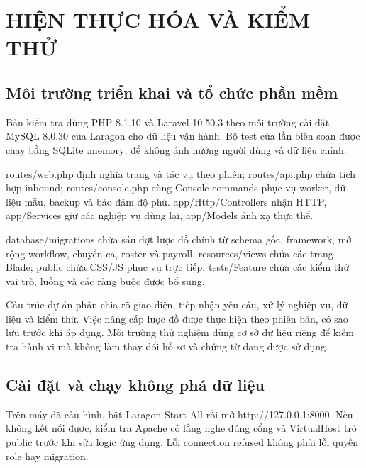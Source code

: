\chapter{HIỆN THỰC HÓA VÀ KIỂM THỬ}\label{ch:implementation}

\section{Môi trường triển khai và tổ chức phần mềm}
Bản kiểm tra dùng PHP 8.\allowbreak{}1.\allowbreak{}10 và Laravel 10.\allowbreak{}50.\allowbreak{}3 theo môi trường cài đặt, My\allowbreak{}SQL 8.\allowbreak{}0.\allowbreak{}30 của Laragon cho dữ liệu vận hành.\allowbreak{} Bộ test của lần biên soạn được chạy bằng SQLite :\allowbreak{}memory:\allowbreak{} để không ảnh hưởng người dùng và dữ liệu chính.\allowbreak{}

routes/\allowbreak{}web.\allowbreak{}php định nghĩa trang và tác vụ theo phiên; routes/\allowbreak{}api.\allowbreak{}php chứa tích hợp inbound; routes/\allowbreak{}console.\allowbreak{}php cùng Console commands phục vụ worker, dữ liệu mẫu, backup và bảo đảm độ phủ.\allowbreak{} app/\allowbreak{}Http/\allowbreak{}Controllers nhận HTTP, app/\allowbreak{}Services giữ các nghiệp vụ dùng lại, app/\allowbreak{}Models ánh xạ thực thể.\allowbreak{}

database/\allowbreak{}migrations chứa sáu đợt lược đồ chính từ schema gốc, framework, mở rộng workflow, chuyển ca, roster và payroll.\allowbreak{} resources/\allowbreak{}views chứa các trang Blade; public chứa CSS/\allowbreak{}JS phục vụ trực tiếp.\allowbreak{} tests/\allowbreak{}Feature chứa các kiểm thử vai trò, luồng và các ràng buộc được bổ sung.\allowbreak{}

Cấu trúc dự án phân chia rõ giao diện, tiếp nhận yêu cầu, xử lý nghiệp vụ, dữ liệu và kiểm thử.\allowbreak{} Việc nâng cấp lược đồ được thực hiện theo phiên bản, có sao lưu trước khi áp dụng.\allowbreak{} Môi trường thử nghiệm dùng cơ sở dữ liệu riêng để kiểm tra hành vi mà không làm thay đổi hồ sơ và chứng từ đang được sử dụng.\allowbreak{}


\section{Cài đặt và chạy không phá dữ liệu}
Trên máy đã cấu hình, bật Laragon Start All rồi mở http:\allowbreak{}/\allowbreak{}/\allowbreak{}127.\allowbreak{}0.\allowbreak{}0.\allowbreak{}1:\allowbreak{}8000.\allowbreak{} Nếu không kết nối được, kiểm tra Apache có lắng nghe đúng cổng và Virtual\allowbreak{}Host trỏ public trước khi sửa logic ứng dụng.\allowbreak{} Lỗi connection refused không phải lỗi quyền role hay migration.\allowbreak{}

